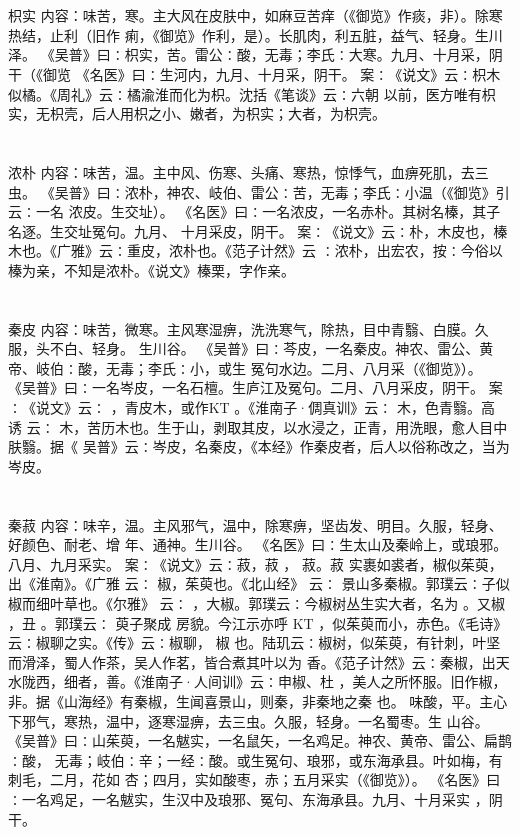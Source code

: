 \documentclass[12pt,UTF8]{ctexbook}
\begin{document}
\chapter{}枳实
内容：味苦，寒。主大风在皮肤中，如麻豆苦痒（《御览》作痰，非）。除寒热结，止利（旧作 
痢，《御览》作利，是）。长肌肉，利五脏，益气、轻身。生川泽。 
《吴普》曰∶枳实，苦。雷公∶酸，无毒；李氏∶大寒。九月、十月采，阴干（《御览 
《名医》曰∶生河内，九月、十月采，阴干。 
案∶《说文》云∶枳木似橘。《周礼》云∶橘渝淮而化为枳。沈括《笔谈》云∶六朝 
以前，医方唯有枳实，无枳壳，后人用枳之小、嫩者，为枳实；大者，为枳壳。 


\chapter{}浓朴
内容：味苦，温。主中风、伤寒、头痛、寒热，惊悸气，血痹死肌，去三虫。 
《吴普》曰∶浓朴，神农、岐伯、雷公∶苦，无毒；李氏∶小温（《御览》引云∶一名 
浓皮。生交址）。 
《名医》曰∶一名浓皮，一名赤朴。其树名榛，其子名逐。生交址冤句。九月、 
十月采皮，阴干。 
案∶《说文》云∶朴，木皮也，榛木也。《广雅》云∶重皮，浓朴也。《范子计然》云 
∶浓朴，出宏农，按∶今俗以榛为亲，不知是浓朴。《说文》榛栗，字作亲。 


\chapter{}秦皮
内容：味苦，微寒。主风寒湿痹，洗洗寒气，除热，目中青翳、白膜。久服，头不白、轻身。 
生川谷。 
《吴普》曰∶芩皮，一名秦皮。神农、雷公、黄帝、岐伯∶酸，无毒；李氏∶小，或生 
冤句水边。二月、八月采（《御览》）。 
《吴普》曰∶一名岑皮，一名石檀。生庐江及冤句。二月、八月采皮，阴干。 
案∶《说文》云∶ ，青皮木，或作KT 。《淮南子·倜真训》云∶ 木，色青翳。高 
诱 
云∶ 木，苦历木也。生于山，剥取其皮，以水浸之，正青，用洗眼，愈人目中肤翳。据《 
吴普》云∶岑皮，名秦皮，《本经》作秦皮者，后人以俗称改之，当为岑皮。 


\chapter{}秦菽
内容：味辛，温。主风邪气，温中，除寒痹，坚齿发、明目。久服，轻身、好颜色、耐老、增 
年、通神。生川谷。 
《名医》曰∶生太山及秦岭上，或琅邪。八月、九月采实。 
案∶《说文》云∶菽，菽 ， 菽。菽 实裹如裘者，椒似茱萸，出《淮南》。《广雅 
云∶ 椒，茱萸也。《北山经》 
云∶ 
景山多秦椒。郭璞云∶子似椒而细叶草也。《尔雅》 
云∶ ，大椒。郭璞云∶今椒树丛生实大者，名为 。又椒 ，丑 。郭璞云∶ 萸子聚成 
房貌。今江示亦呼 KT ，似茱萸而小，赤色。《毛诗》云∶椒聊之实。《传》云∶椒聊， 
椒 
也。陆玑云∶椒树，似茱萸，有针刺，叶坚而滑泽，蜀人作茶，吴人作茗，皆合煮其叶以为 
香。《范子计然》云∶秦椒，出天水陇西，细者，善。《淮南子·人间训》云∶申椒、杜 
，美人之所怀服。旧作椒，非。据《山海经》有秦椒，生闻喜景山，则秦，非秦地之秦 
也。 
味酸，平。主心下邪气，寒热，温中，逐寒湿痹，去三虫。久服，轻身。一名蜀枣。生 
山谷。 
《吴普》曰∶山茱萸，一名魃实，一名鼠矢，一名鸡足。神农、黄帝、雷公、扁鹊∶酸， 
无毒；岐伯∶辛；一经∶酸。或生冤句、琅邪，或东海承县。叶如梅，有刺毛，二月，花如 
杏；四月，实如酸枣，赤；五月采实（《御览》）。 
《名医》曰∶一名鸡足，一名魃实，生汉中及琅邪、冤句、东海承县。九月、十月采实 
，阴干。 
\end{document}
